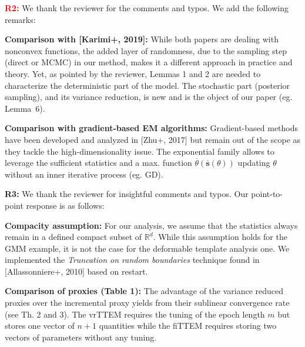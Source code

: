 \documentclass{article}
\begin{document}
\textbf{\textcolor{red}{R2:}} We thank the reviewer for the comments and typos. We add the following remarks:\vspace{-0.05in}

\textbf{Comparison with [Karimi+, 2019]:} 
While both papers are dealing with nonconvex functions, the added layer of randomness, due to the sampling step (direct or MCMC) in our method, makes it a different approach in practice and theory.
Yet, as pointed by the reviewer, Lemmas 1 and 2 are needed to characterize the deterministic part of the model. 
The stochastic part (posterior sampling), and its variance reduction, is new and is the object of our paper (eg. Lemma~6).

\textbf{Comparison with gradient-based EM algorithms:} 
Gradient-based methods have been developed and analyzed in [Zhu+, 2017] but remain out of the scope as they tackle the high-dimensionality issue. 
The exponential family allows to leverage the sufficient statistics and a max. function $ \overline{\theta}( \overline{\textbf{s}}(\theta) )$ updating $\theta$ without an inner iterative process (eg. GD).\vspace{-0.05in}


\textbf{\textcolor{green!50!black}{R3:}} We thank the reviewer for insightful comments and typos. Our point-to-point response is as follows:\vspace{-0.05in}

\textbf{Compacity assumption:}  
For our analysis, we assume that the statistics always remain in a defined compact subset of $\mathbb{R}^d$.
While this assumption holds for the GMM example, it is not the case for the deformable template analysis one.
We implemented the \emph{Truncation on random boundaries} technique found in [Allassonniere+, 2010] based on restart.

\textbf{Comparison of proxies (Table 1):} 
The advantage of the variance reduced proxies over the incremental proxy yields from their sublinear convergence rate (see Th. 2 and 3).
The vrTTEM requires the tuning of the epoch length $m$ but stores one vector of $n+1$ quantities while the fiTTEM requires storing two vectors of parameters without any tuning.\vspace{-0.05in}
\end{document}
